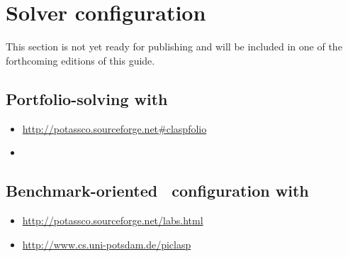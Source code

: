 
\section{Solver configuration}
\label{sec:configuration}

This section is not yet ready for publishing
and will be included in one of the forthcoming editions of this guide.

\subsection{Portfolio-solving with \claspfolio}
\label{sec:claspfolio}

\begin{itemize}
\item \url{http://potassco.sourceforge.net#claspfolio}
\item \cite{holisc14a}
\end{itemize}

\subsection{Benchmark-oriented \clasp\ configuration with \piclasp}
\label{sec:piclasp}

\begin{itemize}
\item \url{http://potassco.sourceforge.net/labs.html}
\item \url{http://www.cs.uni-potsdam.de/piclasp}
\end{itemize}


